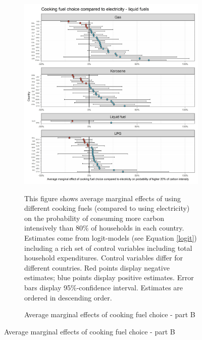  \begin{figure}[ht!]\ContinuedFloat
   \centering
   \begin{subfigure}[b]{\textwidth}
   \centering
   \caption{Average marginal effects of cooking fuel choice - part B} \label{fig:Logit_ME_CF_2}
   \includegraphics{1_Figures/Analysis_Logit_Models_Marginal_Effects/Average_Marginal_Effects_affected_upper_80_CF_Electricity B_2017.jpg}
   \begin{subcaption2}
     This figure shows average marginal effects of using different cooking fuels (compared to using electricity) on the probability of consuming more carbon intensively than 80\% of households in each country. Estimates come from logit-models (see Equation \ref{logit}) including a rich set of control variables including total household expenditures. Control variables differ for different countries. Red points display negative estimates; blue points display positive estimates. Error bars display 95\%-confidence interval. Estimates are ordered in descending order.
   \end{subcaption2}
   \end{subfigure}
 \end{figure}
 \clearpage

